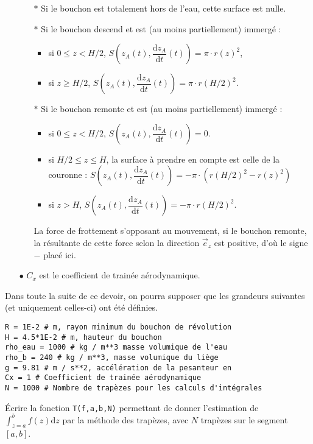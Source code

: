 \begin{itemize}
\begin{itemize}
\item[$\ast$] Si le bouchon est totalement hors de l'eau, cette surface est nulle. 
\item[$\ast$] Si le bouchon descend et est (au moins partiellement) immergé  :
\begin{itemize}
\item si $0\leq z<H/2$, $S\left(z_A(t),\dfrac{\mathrm{d}z_A}{\mathrm{d}t}(t)\right) = \pi\cdot r(z)^2$,
\item si $z \geq H/2$,  $S\left(z_A(t),\dfrac{\mathrm{d}z_A}{\mathrm{d}t}(t)\right) = \pi\cdot r(H/2)^2$.
\end{itemize}
\item[$\ast$] Si le bouchon remonte et est (au moins partiellement) immergé  :
\begin{itemize}
\item si $0\leq z<H/2$, $S\left(z_A(t),\dfrac{\mathrm{d}z_A}{\mathrm{d}t}(t)\right) = 0$.
\item si $H/2\leq z \leq H$, la surface à prendre en compte est celle de la couronne  : $S\left(z_A(t),\dfrac{\mathrm{d}z_A}{\mathrm{d}t}(t)\right) = - \pi\cdot \left(r(H/2)^2-r(z)^2\right)$
\item si $z > H$, $S\left(z_A(t),\dfrac{\mathrm{d}z_A}{\mathrm{d}t}(t)\right) = - \pi\cdot r(H/2)^2$. 
\end{itemize}
La force de frottement s'opposant au mouvement, si le bouchon remonte, la résultante de cette force selon la direction $\overrightarrow{e}_z$ est positive, d'où le signe $-$ placé ici. 
\end{itemize}
\item[$\bullet$] $C_x$ est le coefficient de trainée aérodynamique.
\end{itemize}

Dans toute la suite de ce devoir, on pourra supposer que les grandeurs suivantes (et uniquement celles-ci) ont été définies.
\begin{lstlisting}
R = 1E-2 # m, rayon minimum du bouchon de révolution
H = 4.5*1E-2 # m, hauteur du bouchon
rho_eau = 1000 # kg / m**3 masse volumique de l'eau
rho_b = 240 # kg / m**3, masse volumique du liège
g = 9.81 # m / s**2, accélération de la pesanteur en
Cx = 1 # Coefficient de trainée aérodynamique
N = 1000 # Nombre de trapèzes pour les calculs d'intégrales
\end{lstlisting}

\question{} Écrire la fonction \texttt{T(f,a,b,N)} permettant de donner l'estimation de $\displaystyle{\int_{z=a}^b f(z)\mathrm{d}z}$ par la méthode des trapèzes, avec $N$ trapèzes sur le segment $\left[a,b\right]$.

